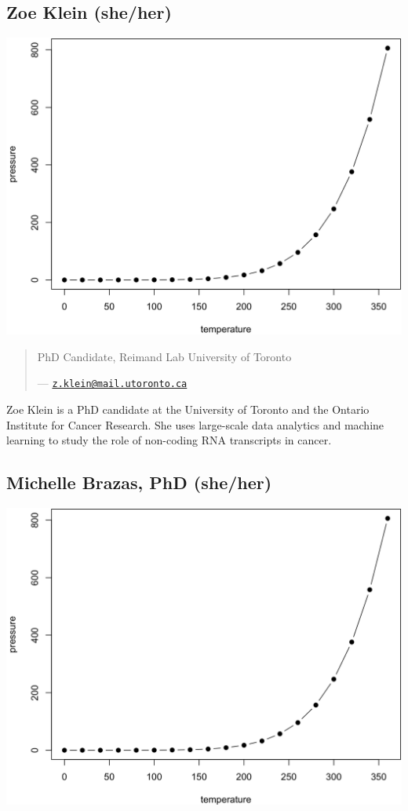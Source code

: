 \documentclass[
]{book}
\theoremstyle{definition}
\theoremstyle{definition}
\theoremstyle{definition}
\theoremstyle{definition}
\theoremstyle{remark}
\begin{document}
\subsection*{\texorpdfstring{Zoe Klein (she/her) }{Zoe Klein  (she/her) }}\label{zoe-klein-sheher}

\begin{center}\includegraphics[width=0.65\linewidth]{./_main_files/figure-html/nice-fig-1} \end{center}

\begin{quote}
PhD Candidate, Reimand Lab
University of Toronto

--- \href{mailto:z.klein@mail.utoronto.ca}{\nolinkurl{z.klein@mail.utoronto.ca}}
\end{quote}

Zoe Klein is a PhD candidate at the University of Toronto and the Ontario Institute for Cancer
Research. She uses large-scale data analytics and machine learning to study the role of
non-coding RNA transcripts in cancer.

\subsection*{\texorpdfstring{Michelle Brazas, PhD (she/her) }{Michelle Brazas, PhD  (she/her) }}\label{michelle-brazas-phd-sheher}

\begin{center}\includegraphics[width=0.65\linewidth]{./_main_files/figure-html/nice-fig-1} \end{center}
\end{document}
